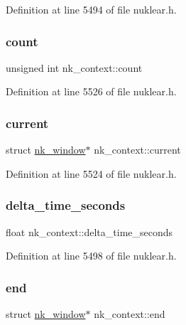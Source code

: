 Definition at line 5494 of file nuklear.\+h.

\mbox{\label{structnk__context_a332f044ac74fd5450fa61097ea45be65}} 
\subsubsection{\texorpdfstring{count}{count}}
{\footnotesize\ttfamily unsigned int nk\+\_\+context\+::count}



Definition at line 5526 of file nuklear.\+h.

\mbox{\label{structnk__context_a63efcbf544ff88f819f4d7e03927d7c6}} 
\subsubsection{\texorpdfstring{current}{current}}
{\footnotesize\ttfamily struct \mbox{\hyperlink{structnk__window}{nk\+\_\+window}}$\ast$ nk\+\_\+context\+::current}



Definition at line 5524 of file nuklear.\+h.

\mbox{\label{structnk__context_a400eeefb70eab5d544831b856300ac06}} 
\subsubsection{\texorpdfstring{delta\+\_\+time\+\_\+seconds}{delta\_time\_seconds}}
{\footnotesize\ttfamily float nk\+\_\+context\+::delta\+\_\+time\+\_\+seconds}



Definition at line 5498 of file nuklear.\+h.

\mbox{\label{structnk__context_a70f3687079206d314b2006db5fc3da05}} 
\subsubsection{\texorpdfstring{end}{end}}
{\footnotesize\ttfamily struct \mbox{\hyperlink{structnk__window}{nk\+\_\+window}}$\ast$ nk\+\_\+context\+::end}



